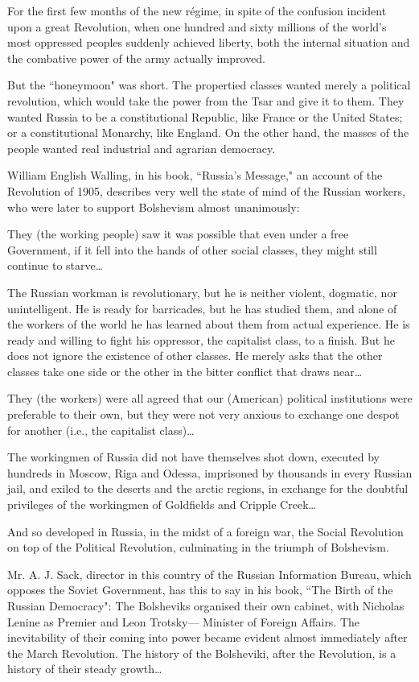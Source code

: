 For the first few months of the new régime, in spite of the confusion incident upon a great Revolution, when one hundred and sixty millions of the world’s most oppressed peoples suddenly achieved liberty, both the internal situation and the combative power of the army actually improved.

But the ``honeymoon" was short. The propertied classes wanted merely a political revolution, which would take the power from the Tsar and give it to them. They wanted Russia to be a constitutional Republic, like France or the United States; or a constitutional Monarchy, like England. On the other hand, the masses of the people wanted real industrial and agrarian democracy.

William English Walling, in his book, ``Russia’s Message," an account of the Revolution of 1905, describes very well the state of mind of the Russian workers, who were later to support Bolshevism almost unanimously:

They (the working people) saw it was possible that even under a free Government, if it fell into the hands of other social classes, they might still continue to starve\ldots

The Russian workman is revolutionary, but he is neither violent, dogmatic, nor unintelligent. He is ready for barricades, but he has studied them, and alone of the workers of the world he has learned about them from actual experience. He is ready and willing to fight his oppressor, the capitalist class, to a finish. But he does not ignore the existence of other classes. He merely asks that the other classes take one side or the other in the bitter conflict that draws near\ldots

They (the workers) were all agreed that our (American) political institutions were preferable to their own, but they were not very anxious to exchange one despot for another (i.e., the capitalist class)\ldots

The workingmen of Russia did not have themselves shot down, executed by hundreds in Moscow, Riga and Odessa, imprisoned by thousands in every Russian jail, and exiled to the deserts and the arctic regions, in exchange for the doubtful privileges of the workingmen of Goldfields and Cripple Creek\ldots

And so developed in Russia, in the midst of a foreign war, the Social Revolution on top of the Political Revolution, culminating in the triumph of Bolshevism.

Mr. A. J. Sack, director in this country of the Russian Information Bureau, which opposes the Soviet Government, has this to say in his book, ``The Birth of the Russian Democracy": The Bolsheviks organised their own cabinet, with Nicholas Lenine as Premier and Leon Trotsky— Minister of Foreign Affairs. The inevitability of their coming into power became evident almost immediately after the March Revolution. The history of the Bolsheviki, after the Revolution, is a history of their steady growth\ldots

